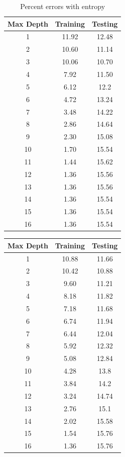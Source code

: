 \documentclass[12pt, fullpage,letterpaper]{article}
\begin{document}
\begin{enumerate}
\begin{enumerate}
		\begin{table}[h]
		\centering
		\begin{tabular}{c|cc}
			Max Depth & Training & Testing\\ 
			\hline\hline
			1 & 11.92 & 12.48  \\ \hline
			2 & 10.60 & 11.14  \\ \hline
			3 & 10.06 & 10.70  \\ \hline
			4 & 7.92 & 11.50  \\ \hline
			5 & 6.12 & 12.2 \\ \hline
			6 & 4.72 & 13.24  \\ \hline
			7 & 3.48 & 14.22  \\ \hline
			8 & 2.86 & 14.64 \\ \hline
			9 & 2.30 & 15.08  \\ \hline
			10 & 1.70 & 15.54  \\ \hline
			11 & 1.44 & 15.62  \\ \hline
			12 & 1.36 & 15.56  \\ \hline
			13 & 1.36 & 15.56  \\ \hline
			14 & 1.36 & 15.54  \\ \hline
			15 & 1.36 & 15.54  \\ \hline
			16 & 1.36 & 15.54  \\ \hline

		\end{tabular}
		\caption{Percent errors with entropy}
		
		\end{table}
		
		\begin{table}[h]
		\centering
		\begin{tabular}{c|cc}
			Max Depth & Training & Testing\\ 
			\hline\hline
			1 & 10.88 & 11.66  \\ \hline
			2 & 10.42 & 10.88  \\ \hline
			3 & 9.60 & 11.21  \\ \hline
			4 & 8.18 & 11.82  \\ \hline
			5 & 7.18 & 11.68 \\ \hline
			6 & 6.74 & 11.94  \\ \hline
			7 & 6.44 & 12.04  \\ \hline
			8 & 5.92 & 12.32 \\ \hline
			9 & 5.08 & 12.84  \\ \hline
			10 & 4.28 & 13.8  \\ \hline
			11 & 3.84 & 14.2  \\ \hline
			12 & 3.24 & 14.74  \\ \hline
			13 & 2.76 & 15.1  \\ \hline
			14 & 2.02 & 15.58  \\ \hline
			15 & 1.54 & 15.76  \\ \hline
			16 & 1.36 & 15.76  \\ \hline


\end{tabular}
\end{table}
\end{enumerate}
\end{enumerate}
\end{document}
